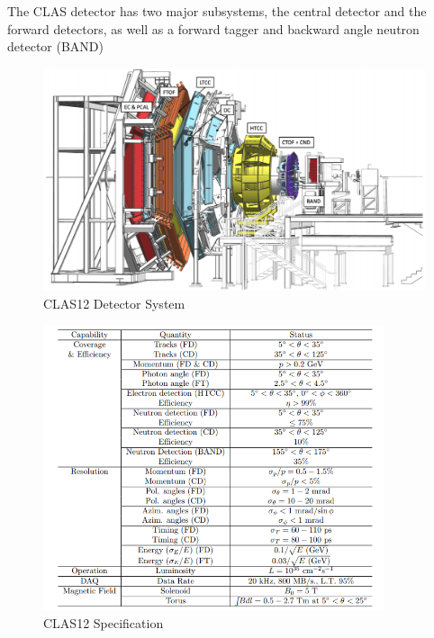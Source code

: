The CLAS detector has two major subsystems, the central detector and the forward detectors, as well as a forward tagger and backward angle neutron detector (BAND)

    \begin{figure}[H]
        \centering
        \includegraphics[width=12cm]{Chapters/Ch2-Experiment/clas-12-exp/clas-detectors/other/pics/CLAS12.png}
        \caption{ CLAS12 Detector System }
    \end{figure}
    
    \begin{figure}[H]
        \centering
        \includegraphics[width=10cm]{Chapters/Ch2-Experiment/clas-12-exp/clas-detectors/other/pics/clas12-params.png}
        \caption{CLAS12 Specification}
    \end{figure}

